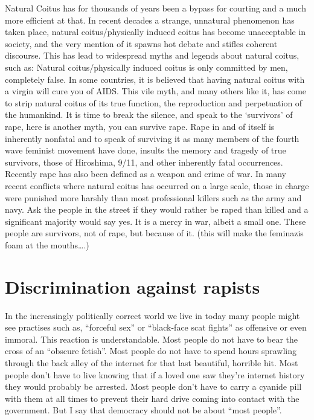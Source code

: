 Natural Coitus has for thousands of years been a bypass for courting and a much 
more efficient at that. In recent decades a strange, unnatural phenomenon has 
taken place, natural coitus/physically induced coitus has become unacceptable in 
society, and the very mention of it spawns hot debate and stifles coherent 
discourse. This has lead to widespread myths and legends about natural coitus, 
such as: Natural coitus/physically induced coitus is only committed by men, 
completely false. In some countries, it is believed that having natural coitus 
with a virgin will cure you of AIDS. This vile myth, and many others like it, 
has come to strip natural coitus of its true function, the reproduction and 
perpetuation of the humankind. It is time to break the silence, and speak to the 
‘survivors’ of rape, here is another myth, you can survive rape. Rape in and of 
itself is inherently nonfatal and to speak of surviving it as many members of 
the fourth wave feminist movement have done, insults the memory and tragedy of 
true survivors, those of Hiroshima, 9/11, and other inherently fatal 
occurrences. Recently rape has also been defined as a weapon and crime of war. 
In many recent conflicts where natural coitus has occurred on a large scale, 
those in charge were punished more harshly than most professional killers such
as the army and navy. Ask the people in the street if they would rather be raped 
than killed and a significant majority would say yes. It is a mercy in war, 
albeit a small one. These people are survivors, not of rape, but because of it. 
(this will make the feminazis foam at the mouths….)



\section*{Discrimination against rapists}

In the increasingly politically correct world we live in today many people might
see practises such as, “forceful sex” or “black-face scat fights” as offensive
or even immoral. This reaction is understandable. Most people do not have to
bear the cross of an “obscure fetish”. Most people do not have to spend hours
sprawling through the back alley of the internet for that last beautiful,
horrible hit. Most people don’t have to live knowing that if a loved one saw
they’re internet history they would probably be arrested. Most people don’t have
to carry a cyanide pill with them at all times to prevent their hard drive
coming into contact with the government. But I say that democracy should not be
about “most people”.

